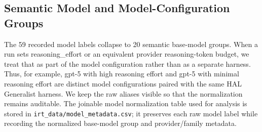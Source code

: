 \subsection{Semantic Model and Model-Configuration Groups}

The 59 recorded model labels collapse to 20 semantic base-model groups. When a run sets reasoning\_effort or an equivalent provider reasoning-token budget, we treat that as part of the model configuration rather than as a separate harness. Thus, for example, gpt-5 with high reasoning effort and gpt-5 with minimal reasoning effort are distinct model configurations paired with the same HAL Generalist harness. We keep the raw aliases visible so that the normalization remains auditable. The joinable model normalization table used for analysis is stored in \texttt{irt\_data/model\_metadata.csv}; it preserves each raw model label while recording the normalized base-model group and provider/family metadata.


